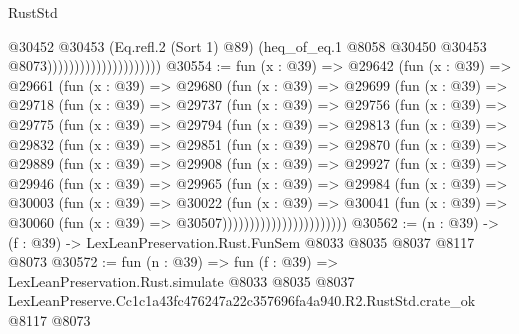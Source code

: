\begin{lexlean}{RustStd}
\begin{coremodule}
                                          @30452
                                            @30453
                                            (Eq.refl.{2} (Sort 1) @89)
                                            (heq_of_eq.{1}
                                              @8058
                                              @30450
                                              @30453
                                              @8073)))))))))))))))))))))
@30554 := fun (x : @39) =>
  @29642
    (fun (x : @39) =>
    @29661
      (fun (x : @39) =>
      @29680
        (fun (x : @39) =>
        @29699
          (fun (x : @39) =>
          @29718
            (fun (x : @39) =>
            @29737
              (fun (x : @39) =>
              @29756
                (fun (x : @39) =>
                @29775
                  (fun (x : @39) =>
                  @29794
                    (fun (x : @39) =>
                    @29813
                      (fun (x : @39) =>
                      @29832
                        (fun (x : @39) =>
                        @29851
                          (fun (x : @39) =>
                          @29870
                            (fun (x : @39) =>
                            @29889
                              (fun (x : @39) =>
                              @29908
                                (fun (x : @39) =>
                                @29927
                                  (fun (x : @39) =>
                                  @29946
                                    (fun (x : @39) =>
                                    @29965
                                      (fun (x : @39) =>
                                      @29984
                                        (fun (x : @39) =>
                                        @30003
                                          (fun (x : @39) =>
                                          @30022
                                            (fun (x : @39) =>
                                            @30041
                                              (fun (x : @39) =>
                                              @30060 (fun (x : @39) => @30507)))))))))))))))))))))))
@30562 := (n : @39) -> (f : @39) -> LexLeanPreservation.Rust.FunSem @8033 @8035 @8037 @8117 @8073
@30572 := fun (n : @39) =>
  fun (f : @39) =>
  LexLeanPreservation.Rust.simulate
    @8033
    @8035
    @8037
    LexLeanPreserve.Cc1c1a43fc476247a22c357696fa4a940.R2.RustStd.crate_ok
    @8117
    @8073
\end{coremodule}
\end{lexlean}
